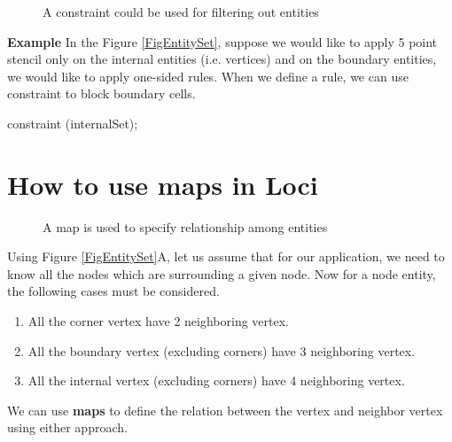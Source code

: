 \begin{figure}[h]
\vspace*{2.80in}\caption {A constraint could be used for filtering out entities }
\label{FigConstraint}
\end{figure}

\par {\bf Example} In the Figure \ref{FigEntitySet}, suppose we would like to 
apply 5 point stencil only on the internal entities (i.e. vertices) and on the 
boundary entities, we would like to apply one-sided rules. When we define a 
rule, we can use constraint to block boundary cells.

constraint (internalSet);

%
\section { How to use maps in Loci}
\begin{figure}[h]
\vspace{2.1in}\caption { A map is used to specify relationship among
entities }
\label{FigMaps}
\end{figure}
%
Using Figure \ref{FigEntitySet}A, let us assume that for our application,
we need to know all the nodes which are surrounding a given node. Now for
a node entity, the following cases must be considered.
\begin{enumerate}
\item  All the corner vertex have 2 neighboring vertex.
\item  All the boundary vertex (excluding corners) have 3 neighboring vertex.
\item  All the internal vertex (excluding corners) have 4 neighboring vertex.
\end{enumerate}
%
\par We can use {\bf maps} to define the relation between the vertex and
neighbor vertex using either approach.
%
